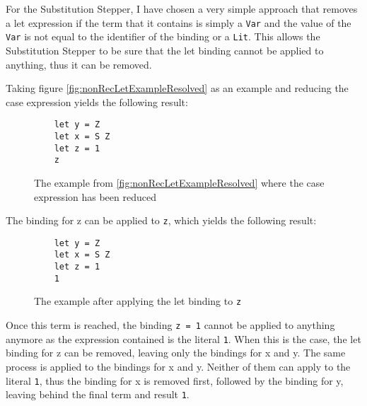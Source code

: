 For the Substitution Stepper,
I have chosen a very simple approach that removes a let expression if the term that it contains is simply a \texttt{Var} and the value of the \texttt{Var} is not equal to the identifier of the binding or a \texttt{Lit}.
This allows the Substitution Stepper to be sure that the let binding cannot be applied to anything,
thus it can be removed.

Taking figure \ref*{fig:nonRecLetExampleResolved} as an example and reducing the case expression yields the following result:

\begin{figure}[!ht]
\begin{verbatim}
    let y = Z
    let x = S Z
    let z = 1
    z
\end{verbatim}
    \caption{The example from \ref*{fig:nonRecLetExampleResolved} where the case expression has been reduced}
\end{figure}

The binding for z can be applied to \texttt{z}, which yields the following result:

\begin{figure}[!ht]
\begin{verbatim}
    let y = Z
    let x = S Z
    let z = 1
    1
\end{verbatim}
    \caption{The example after applying the let binding to \texttt{z}}
\end{figure}

Once this term is reached, the binding \texttt{z = 1} cannot be applied to anything anymore as the expression contained is the literal \texttt{1}.
When this is the case, the let binding for z can be removed, leaving only the bindings for x and y.
The same process is applied to the bindings for x and y.
Neither of them can apply to the literal \texttt{1},
thus the binding for x is removed first, followed by the binding for y,
leaving behind the final term and result \texttt{1}.

